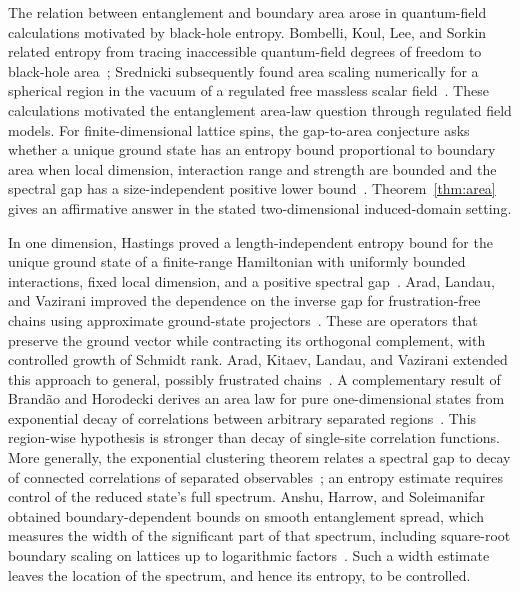 The relation between entanglement and boundary area arose in quantum-field
calculations motivated by black-hole entropy.  Bombelli, Koul, Lee, and
Sorkin related entropy from tracing inaccessible quantum-field degrees of
freedom to black-hole area~\cite{BombelliEtAl1986}; Srednicki subsequently found area scaling
numerically for a spherical region in the vacuum of a regulated free
massless scalar field~\cite{Srednicki1993}.  These calculations motivated
the entanglement area-law question through regulated field models. For
finite-dimensional lattice spins, the gap-to-area conjecture asks whether
a unique ground state has an entropy bound proportional to boundary area
when local dimension, interaction range and strength are bounded and the
spectral gap has a size-independent positive lower
bound~\cite{Hastings2007,AradLandauVazirani2012}.
Theorem~\ref{thm:area} gives an affirmative answer in the stated
two-dimensional induced-domain setting.

In one dimension, Hastings proved a length-independent entropy bound for
the unique ground state of a finite-range Hamiltonian with uniformly
bounded interactions, fixed local dimension, and a positive spectral
gap~\cite{Hastings2007}.  Arad, Landau, and Vazirani improved the dependence
on the inverse gap for frustration-free chains using approximate ground-state
projectors~\cite{AradLandauVazirani2012}.  These are operators that preserve
the ground vector while contracting its orthogonal complement, with
controlled growth of Schmidt rank.  Arad, Kitaev, Landau, and Vazirani
extended this approach to general, possibly frustrated
chains~\cite{AradKitaevLandauVazirani2013}.  A complementary result of Brand\~ao and Horodecki
derives an area law for pure one-dimensional states from exponential
decay of correlations between arbitrary separated
regions~\cite{BrandaoHorodecki2015}.  This region-wise hypothesis is
stronger than decay of single-site correlation functions.  More generally,
the exponential clustering theorem relates a spectral gap to decay of
connected correlations of separated
observables~\cite{NachtergaeleSims2006}; an entropy estimate requires
control of the reduced state's full spectrum.
Anshu, Harrow, and Soleimanifar obtained boundary-dependent bounds on
smooth entanglement spread, which measures the width of the significant
part of that spectrum, including square-root boundary scaling on lattices
up to logarithmic factors~\cite{AnshuHarrowSoleimanifar2022}.  Such a width
estimate leaves the location of the spectrum, and hence its entropy,
to be controlled.


